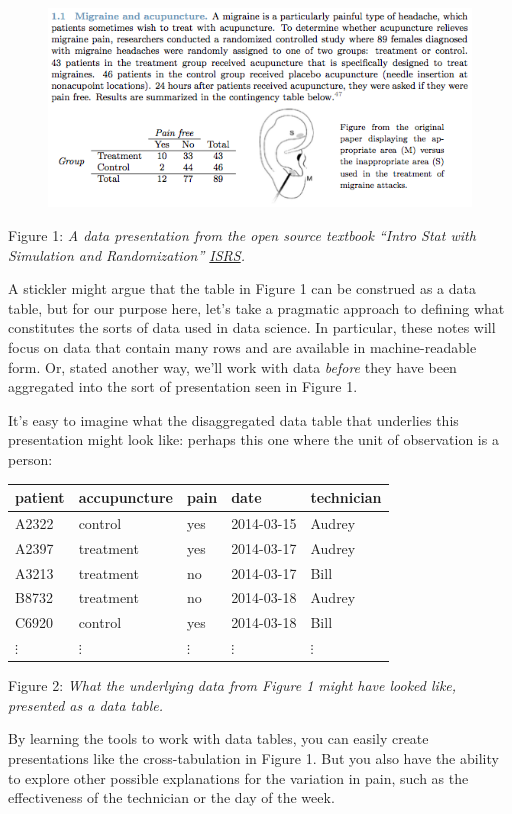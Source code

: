 \documentclass[]{book}
\theoremstyle{definition}
\theoremstyle{definition}
\theoremstyle{definition}
\theoremstyle{remark}
\begin{document}
\begin{figure}
\centering
\includegraphics{images/migrane-isrs1.png}
\caption{}
\end{figure}

Figure 1: \emph{A data presentation from the open source textbook
``Intro Stat with Simulation and Randomization''
\href{https://www.openintro.org/stat/textbook.php?stat_book=isrs}{ISRS}.}

A stickler might argue that the table in Figure 1 can be construed as a
data table, but for our purpose here, let's take a pragmatic approach to
defining what constitutes the sorts of data used in data science. In
particular, these notes will focus on data that contain many rows and
are available in machine-readable form. Or, stated another way, we'll
work with data \emph{before} they have been aggregated into the sort of
presentation seen in Figure 1.

It's easy to imagine what the disaggregated data table that underlies
this presentation might look like: perhaps this one where the unit of
observation is a person:

\begin{longtable}[]{@{}lllll@{}}
\toprule
patient & accupuncture & pain & date & technician\tabularnewline
\midrule
\endhead
A2322 & control & yes & 2014-03-15 & Audrey\tabularnewline
A2397 & treatment & yes & 2014-03-17 & Audrey\tabularnewline
A3213 & treatment & no & 2014-03-17 & Bill\tabularnewline
B8732 & treatment & no & 2014-03-18 & Audrey\tabularnewline
C6920 & control & yes & 2014-03-18 & Bill\tabularnewline
\(\vdots\) & \(\vdots\) & \(\vdots\) & \(\vdots\) &
\(\vdots\)\tabularnewline
\bottomrule
\end{longtable}

Figure 2: \emph{What the underlying data from Figure 1 might have looked
like, presented as a data table.}

By learning the tools to work with data tables, you can easily create
presentations like the cross-tabulation in Figure 1. But you also have
the ability to explore other possible explanations for the variation in
pain, such as the effectiveness of the technician or the day of the
week.
\end{document}
